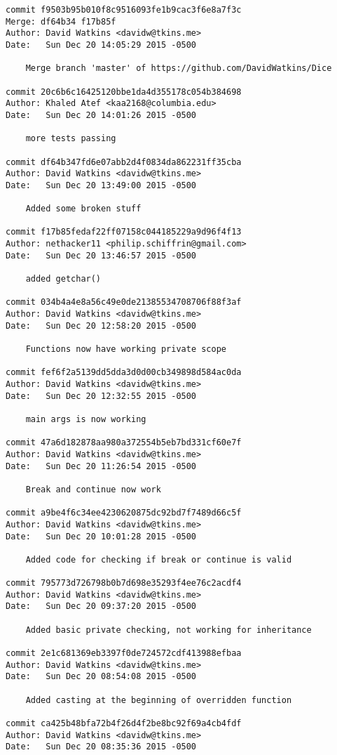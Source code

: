 \begin{verbatim}
commit f9503b95b010f8c9516093fe1b9cac3f6e8a7f3c
Merge: df64b34 f17b85f
Author: David Watkins <davidw@tkins.me>
Date:   Sun Dec 20 14:05:29 2015 -0500

    Merge branch 'master' of https://github.com/DavidWatkins/Dice

commit 20c6b6c16425120bbe1da4d355178c054b384698
Author: Khaled Atef <kaa2168@columbia.edu>
Date:   Sun Dec 20 14:01:26 2015 -0500

    more tests passing

commit df64b347fd6e07abb2d4f0834da862231ff35cba
Author: David Watkins <davidw@tkins.me>
Date:   Sun Dec 20 13:49:00 2015 -0500

    Added some broken stuff

commit f17b85fedaf22ff07158c044185229a9d96f4f13
Author: nethacker11 <philip.schiffrin@gmail.com>
Date:   Sun Dec 20 13:46:57 2015 -0500

    added getchar()

commit 034b4a4e8a56c49e0de21385534708706f88f3af
Author: David Watkins <davidw@tkins.me>
Date:   Sun Dec 20 12:58:20 2015 -0500

    Functions now have working private scope

commit fef6f2a5139dd5dda3d0d00cb349898d584ac0da
Author: David Watkins <davidw@tkins.me>
Date:   Sun Dec 20 12:32:55 2015 -0500

    main args is now working

commit 47a6d182878aa980a372554b5eb7bd331cf60e7f
Author: David Watkins <davidw@tkins.me>
Date:   Sun Dec 20 11:26:54 2015 -0500

    Break and continue now work

commit a9be4f6c34ee4230620875dc92bd7f7489d66c5f
Author: David Watkins <davidw@tkins.me>
Date:   Sun Dec 20 10:01:28 2015 -0500

    Added code for checking if break or continue is valid

commit 795773d726798b0b7d698e35293f4ee76c2acdf4
Author: David Watkins <davidw@tkins.me>
Date:   Sun Dec 20 09:37:20 2015 -0500

    Added basic private checking, not working for inheritance

commit 2e1c681369eb3397f0de724572cdf413988efbaa
Author: David Watkins <davidw@tkins.me>
Date:   Sun Dec 20 08:54:08 2015 -0500

    Added casting at the beginning of overridden function

commit ca425b48bfa72b4f26d4f2be8bc92f69a4cb4fdf
Author: David Watkins <davidw@tkins.me>
Date:   Sun Dec 20 08:35:36 2015 -0500


\end{verbatim}
